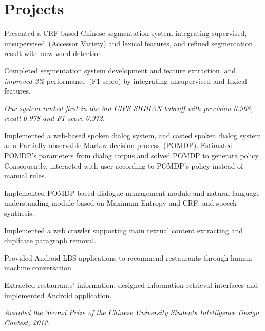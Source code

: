 \documentclass[11pt,a4paper]{resume}
\begin{document}
\section{Projects}
\begin{workitemize}
  \item Presented a CRF-based Chinese segmentation system integrating
    supervised, unsupervised~(Accessor Variety) and lexical features, and
    refined segmentation result with new word detection.
  \item Completed segmentation system development and feature extraction, and
    \emph{improved 2\%} performance~(F1 score) by integrating unsupervised and
    lexical features.
  \item \emph{Our system ranked first in the 3rd CIPS-SIGHAN bakeoff with
    precision 0.968, recall 0.978 and F1 score 0.972.}
\end{workitemize}

\begin{workitemize}
  \item Implemented a web-based spoken dialog system, and casted spoken dialog
    system as a Partially observable Markov decision process~(POMDP). Estimated
    POMDP's parameters from dialog corpus and solved POMDP to generate policy.
    Consequently, interacted with user according to POMDP's policy instead of
    manual rules.
  \item Implemented POMDP-based dialogue management module and natural language
    understanding module based on Maximum Entropy and CRF.\@
    and speech synthesis.
\end{workitemize}

\begin{workitemize}
  \item Implemented a web crawler supporting main textual content extracting
    and duplicate paragraph removal.
\end{workitemize}

\begin{workitemize}
  \item Provided Android LBS applications to recommend restaurants through
    human-machine conversation.
  \item Extracted restaurants' information, designed information retrieval
    interfaces and implemented Android application.
  \item \emph{Awarded the Second Prize of the Chinese University Students
    Intelligence Design Contest, 2012.}
\end{workitemize}
\end{document}
